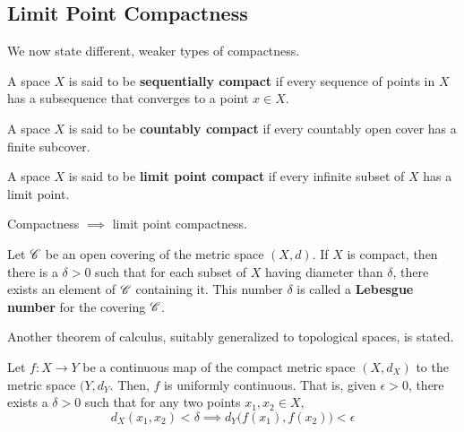 \subsection{Limit Point Compactness}

  We now state different, weaker types of compactness. 

  \begin{definition}
    A space $X$ is said to be \textbf{sequentially compact} if every sequence of points in $X$ has a subsequence that converges to a point $x \in X$. 
  \end{definition}

  \begin{definition}
    A space $X$ is said to be \textbf{countably compact} if every countably open cover has a finite subcover. 
  \end{definition}

  \begin{definition}
    A space $X$ is said to be \textbf{limit point compact} if every infinite subset of $X$ has a limit point. 
  \end{definition}

  \begin{theorem}
    Compactness $\implies$ limit point compactness.  
  \end{theorem}

  \begin{lemma}
    Let $\operatorname{\mathscr{C}}$ be an open covering of the metric space $(X, d)$. If $X$ is compact, then there is a $\delta > 0$ such that for each subset of $X$ having diameter than $\delta$, there exists an element of $\operatorname{\mathscr{C}}$ containing it. This number $\delta$ is called a \textbf{Lebesgue number} for the covering $\operatorname{\mathscr{C}}$. 
  \end{lemma}

  Another theorem of calculus, suitably generalized to topological spaces, is stated. 

  \begin{theorem}
    Let $f: X \rightarrow Y$ be a continuous map of the compact metric space $(X,d_X)$ to the metric space $(Y, d_Y$. Then, $f$ is uniformly continuous. That is, given $\epsilon > 0$, there exists a $\delta > 0$ such that for any two points $x_1, x_2 \in X$, 
    \begin{equation}
      d_X (x_1, x_2) < \delta \implies d_Y \big( f(x_1), f(x_2)\big) < \epsilon
    \end{equation}
  \end{theorem}

